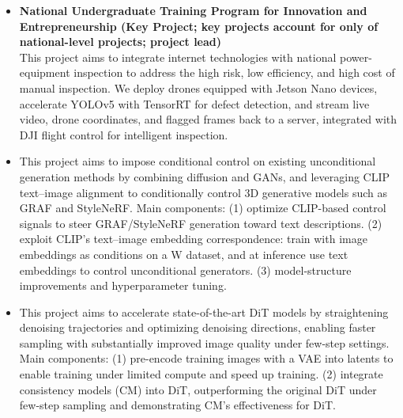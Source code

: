 \documentclass{resume}
\begin{document}
\vspace{-0.5ex}
\begin{onehalfspacing}
\begin{itemize}
\item \textbf{National Undergraduate Training Program for Innovation and Entrepreneurship (Key Project; key projects account for only \textbf{\color{blue}{0.2\%}} of national-level projects; project lead)}\\
This project aims to integrate internet technologies with national power-equipment inspection to address the high risk, low efficiency, and high cost of manual inspection. We deploy drones equipped with Jetson Nano devices, accelerate YOLOv5 with TensorRT for defect detection, and stream live video, drone coordinates, and flagged frames back to a server, integrated with DJI flight control for intelligent inspection.
\end{itemize}
\end{onehalfspacing}

\vspace{-0.5ex}
\begin{onehalfspacing}
\begin{itemize}
\item
This project aims to impose conditional control on existing unconditional generation methods by combining diffusion and GANs, and leveraging CLIP text--image alignment to conditionally control 3D generative models such as GRAF and StyleNeRF. Main components: (1) optimize CLIP-based control signals to steer GRAF/StyleNeRF generation toward text descriptions. (2) exploit CLIP’s text--image embedding correspondence: train with image embeddings as conditions on a W dataset, and at inference use text embeddings to control unconditional generators. (3) model-structure improvements and hyperparameter tuning.
\end{itemize}
\end{onehalfspacing}

\vspace{-0.5ex}
\begin{onehalfspacing}
\begin{itemize}
\item
This project aims to accelerate state-of-the-art DiT models by straightening denoising trajectories and optimizing denoising directions, enabling faster sampling with substantially improved image quality under few-step settings. Main components: (1) pre-encode training images with a VAE into latents to enable training under limited compute and speed up training. (2) integrate consistency models (CM) into DiT, outperforming the original DiT under few-step sampling and demonstrating CM’s effectiveness for DiT.
\end{itemize}
\end{onehalfspacing}
\end{document}
